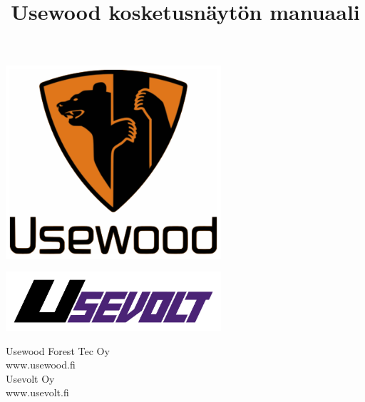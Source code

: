 \documentclass[12pt,a4paper,finnish]{uvmanual}
\title{Usewood kosketusnäytön manuaali}
\begin{document}
%	
\thispagestyle{empty}
\vspace*{-1cm}\noindent
\begin{center}
\includegraphics[width=8cm]{img/uw_logo_color.png}   %
\end{center}
\vspace{1cm}
\begin{center}
\includegraphics[width=8cm]{img/Usevolt.png}   %
\end{center}



\vspace{2.8cm}
\maketitle
\vspace{2.8cm}


\begin{minipage}[c]{8.8cm}
  \begin{spacing}{1.0}
    \textsf{Usewood Forest Tec Oy}\\
    \textsf{www.usewood.fi}\\
    \textsf{Usevolt Oy}\\
    \textsf{www.usevolt.fi}\\
  \end{spacing}
\end{minipage}
\end{document}

